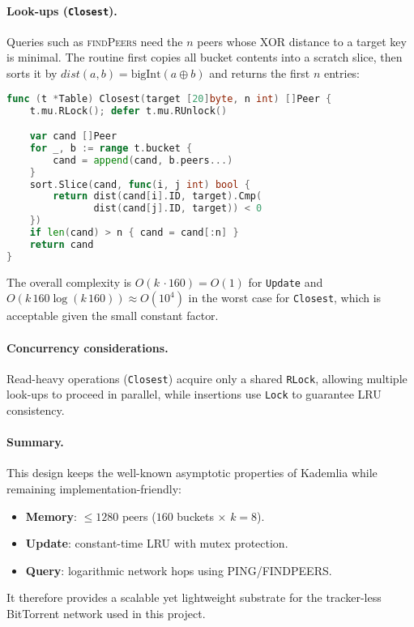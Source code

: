 \documentclass[11pt,a4paper]{article}
\begin{document}
\paragraph{Look-ups (\texttt{Closest}).}
Queries such as \textsc{findPeers} need the \emph{\(n\)} peers whose XOR
distance to a target key is minimal.
The routine first copies all bucket contents into a scratch slice,
then sorts it by
\(\mathit{dist}(a,b)=\text{bigInt}(a\oplus b)\) and returns the first
\(n\) entries:

\begin{lstlisting}[language=go,caption={Selecting the \(n\) closest peers.}]
func (t *Table) Closest(target [20]byte, n int) []Peer {
    t.mu.RLock(); defer t.mu.RUnlock()

    var cand []Peer
    for _, b := range t.bucket {
        cand = append(cand, b.peers...)
    }
    sort.Slice(cand, func(i, j int) bool {
        return dist(cand[i].ID, target).Cmp(
               dist(cand[j].ID, target)) < 0
    })
    if len(cand) > n { cand = cand[:n] }
    return cand
}
\end{lstlisting}

The overall complexity is
\(O(k\,\cdot160) = O(1)\) for
\texttt{Update}
and \(O(k\,160\log(k\,160))\approx O(10^4)\)
in the worst case for \texttt{Closest}, which is acceptable given the
small constant factor.

\paragraph{Concurrency considerations.}
Read-heavy operations (\texttt{Closest}) acquire only a shared
\lstinline{RLock}, allowing multiple look-ups to proceed in parallel,
while insertions use \lstinline{Lock} to guarantee LRU consistency.

\paragraph{Summary.}
This design keeps the
well-known asymptotic properties of Kademlia while remaining
implementation-friendly:

\begin{itemize}
  \item \textbf{Memory}: \( \le 1280 \) peers (\(160\) buckets × \(k{=}8\)).
  \item \textbf{Update}: constant-time LRU with mutex protection.
  \item \textbf{Query}: logarithmic network hops using
        \textsc{PING}/\textsc{FIND}\textsc{PEERS}.
\end{itemize}
It therefore provides a scalable yet lightweight substrate for the
tracker-less BitTorrent network used in this project.
\end{document}
